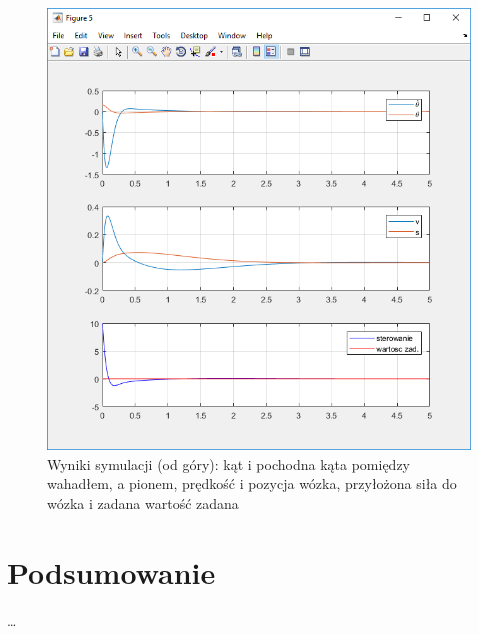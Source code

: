\documentclass[10pt,a4paper,titlepage]{article}
\begin{document}
	\begin{figure}[H]
		\center
		\includegraphics[width=\textwidth]{wyniksymulacji2.png}
		\caption{Wyniki symulacji (od góry): kąt i pochodna kąta pomiędzy wahadłem, a pionem, prędkość i pozycja wózka, przyłożona siła do wózka i zadana wartość zadana}
	\end{figure}
	
	\section{Podsumowanie}
	\ldots
\end{document}
